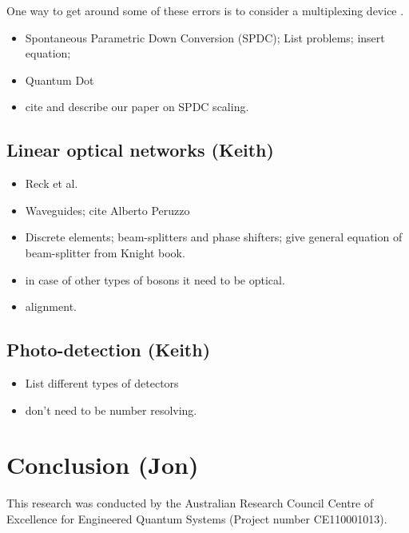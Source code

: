 \documentclass[aps,pra,twocolumn,amsmath,amssymb,nofootinbib,superscriptaddress]{revtex4}
\begin{document}
One way to get around some of these errors is to consider a multiplexing device \cite{}.

\begin{itemize}
\item Spontaneous Parametric Down Conversion (SPDC); List problems; insert equation; 
\item Quantum Dot
\item cite and describe our paper on SPDC scaling.
\end{itemize}

\subsection{Linear optical networks (Keith)}

\begin{itemize}
\item Reck et al.
\item Waveguides; cite Alberto Peruzzo
\item Discrete elements; beam-splitters and phase shifters; give general equation of beam-splitter from Knight book.
\item in case of other types of bosons it need to be optical.
\item alignment.
\end{itemize}

\subsection{Photo-detection (Keith)}

\begin{itemize}
\item List different types of detectors
\item don't need to be number resolving.
\end{itemize}

\section{Conclusion (Jon)}

%
%

\begin{acknowledgments}
This research was conducted by the Australian Research Council Centre of Excellence for Engineered Quantum Systems (Project number CE110001013).
\end{acknowledgments}

%
%


\end{document}
